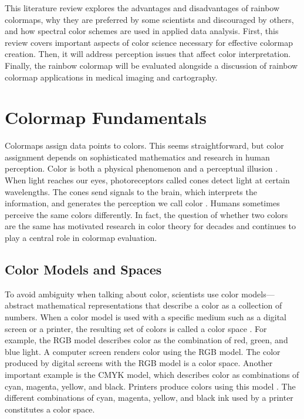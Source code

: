 \documentclass[journal,12pt]{IEEEtran}
\begin{document}
This literature review explores the advantages and disadvantages
of rainbow colormaps, why they are preferred by some
scientists and discouraged by others, and how spectral color schemes are used
in applied data analysis. First, this review covers important aspects of color science
necessary for effective colormap creation. Then, it will
address perception issues that affect color interpretation. 
Finally, the rainbow colormap will be evaluated alongside a discussion of rainbow colormap applications
in medical imaging and cartography.

\section{Colormap Fundamentals}

Colormaps assign data points to colors. This seems straightforward, but color assignment
depends on sophisticated mathematics and research in human perception. 
Color is both a physical phenomenon and a perceptual illusion \cite{endofrainbow}.
When light reaches our eyes, photoreceptors called cones detect light at certain wavelengths.
The cones send signals to the brain, which interprets the information,
and generates the perception we call color \cite{viridis}. Humans sometimes perceive the same
colors differently. In fact, the question of whether two colors are the same has motivated
research in color theory for decades and continues to play a central role in colormap 
evaluation.

\subsection{Color Models and Spaces}

To avoid ambiguity when talking about color, scientists use
color models---abstract mathematical representations that
describe a color as a collection of numbers.
When a color model is used with a specific medium such as a digital screen or a printer, the resulting set
of colors is called a color space \cite{colorimetry}. For example, the RGB model
describes color as the combination of red, green, and
blue light. A computer screen renders color using the
RGB model. The color produced by digital screens
with the RGB model is a color space. Another important example is the
CMYK model, which describes color as combinations of
cyan, magenta, yellow, and black. Printers produce colors using this model
\cite{colormapping}. The different combinations of cyan, magenta, yellow, and black
ink used by a printer constitutes a color space.
\end{document}
